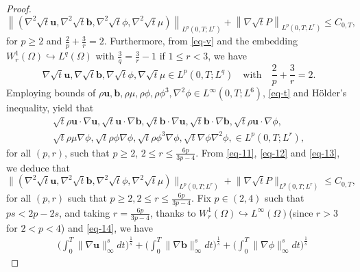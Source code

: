 \documentclass[10pt,a4paper]{amsart}
\begin{document}
\begin{proof}
\begin{equation}
\left\lVert (\nabla^2 \sqrt{t} \mathbf{u}, \nabla^2 \sqrt{t} \mathbf{b}, \nabla^2 \sqrt{t} \phi,  \nabla^2 \sqrt{t} \mu) \right\rVert_{L^p(0,T;L^r)} + \left\lVert \nabla \sqrt{t} P \right\rVert_{L^p(0,T;L^r)} \leq C_{0,T} ,\label{eq-v}
\end{equation}
for $p \geq 2 $ and $ \frac{2}{p} + \frac{3}{r} = 2 $. Furthermore, from \eqref{eq-v} and the embedding \( W^1_r(\Omega) \hookrightarrow L^q(\Omega) \) with \( \frac{3}{q} = \frac{3}{r} - 1 \) if \( 1 \leq r < 3 \), we have
\begin{equation}
\nabla \sqrt{t} \mathbf{u}, \nabla \sqrt{t} \mathbf{b}, \nabla \sqrt{t} \phi, \nabla \sqrt{t} \mu \in L^p(0, T; L^q)  \quad \text{with} \quad \frac{2}{p} + \frac{3}{r} = 2.\label{eq-t}
\end{equation}
Employing bounds  of \( \rho \mathbf{u}, \mathbf{b}, \rho\mu, \rho\phi, \rho\phi^3, \nabla^2\phi \in L^\infty(0, T; L^6) \), \eqref{eq-t} and H\"older's inequality, yield that
\begin{equation}
\begin{split}
\sqrt{t} \rho \mathbf{u} \cdot \nabla \mathbf{u}, \sqrt{t} \mathbf{u} \cdot \nabla \mathbf{b}, \sqrt{t} \mathbf{b} \cdot \nabla \mathbf{u}, \sqrt{t} \mathbf{b} \cdot \nabla \mathbf{b}, \sqrt{t} \rho \mathbf{u} \cdot \nabla \phi,\label{eq-13}\\
\sqrt{t} \rho \mu \nabla \phi, \sqrt{t} \rho \phi \nabla \phi, \sqrt{t} \rho \phi^3 \nabla \phi, \sqrt{t} \nabla \phi\nabla^2\phi, \in L^p(0, T; L^r),
\end{split}
\end{equation}
for all $(p, r)$, such that $p \geq 2$, $2 \leq r \leq \frac{6p}{3p - 4}$. From \eqref{eq-11}, \eqref{eq-12} and \eqref{eq-13}, we deduce that
\begin{equation}
\bigl\| (\nabla^2 \sqrt{t} \mathbf{u}, \nabla^2 \sqrt{t} \mathbf{b}, \nabla^2 \sqrt{t} \phi, \nabla^2 \sqrt{t} \mu) \bigr\|_{L^p(0, T; L^r)} + \bigl\| \nabla \sqrt{t} P \bigr\|_{L^p(0, T; L^r)} \leq C_{0, T},\label{eq-14}
\end{equation}
for all \( (p, r) \) such that $ p \geq 2, 2\leq r \leq \frac{6p}{3p - 4} $. Fix $p \in (2,4)$ such that $ps < 2p - 2s$,  and taking  $r=\frac{6p}{3p - 4}$,  thanks to $W_r^1(\Omega) \hookrightarrow L^\infty(\Omega)$(since $r > 3$ for $2 < p < 4$) and \eqref{eq-14}, we have
\begin{equation*}
\begin{split}
&\big( \int_0^T \big\lVert \nabla \mathbf{u} \big\rVert_\infty^s dt \big)^{\frac{1}{s}} +\big( \int_0^T \big\lVert \nabla \mathbf{b} \big\rVert_\infty^s dt \big)^{\frac{1}{s}} + \big( \int_0^T \big\lVert \nabla \phi \big\rVert_\infty^s dt \big)^{\frac{1}{s}}

\end{split}
\end{equation*}
\end{proof}
\end{document}
